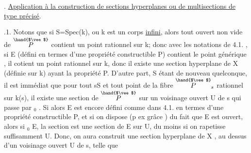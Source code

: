 

. \uline{Application à la construction de sections hyperplanes ou de multisections
de type précisé}.

.1. Notons que si S=Spec(k), ou k est un corps \uline{infini}, alors tout ouvert
non vide de $\overset{\hand{$\vee$}}{P}$ contient un point rationnel sur k; donc avec les notations de
4.1. , si E (défini en termes d'une propriété constructible P) contient
le point générique \hand{$\eta$} , il cotient  un point rationnel sur k, donc
il existe une section hyperplane de X (définie sur k) ayant la propriété P.
D'autre part, S étant de nouveau quelconque, il est immédiat que pour tout
s\hand{$\in$}S et tout point de la fibre $\overset{\hand{$\vee$}}{P}_s$ rationnel sur k(s), il existe une section
\hand{$\xi$} de $\overset{\hand{$\vee$}}{P}$ sur un voisinage ouvert U de s qui passe par \hand{$\xi$}$_0$ . Si alors E est
encore  défini comme dans 4.1. en termes d'une propriété constructible
P, et si on dispose (p ex grâce ) du fait que E est ouvert, alors
si \hand{$\xi$}$_0$\hand{$\in$} E,  la section \hand{$\xi$} est une section de E sur 
U, du moins si on rapetisse suffisamment U. Donc, on aura construit une
section hyperplane de X , au dessus d'un voisinage ouvert U de s, telle que

